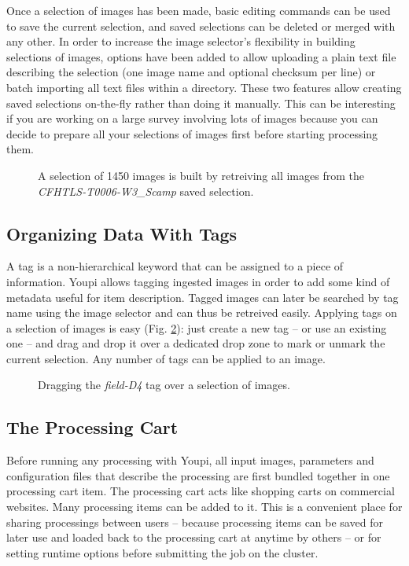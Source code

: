 \documentclass[11pt,twoside]{article}  %
\begin{document}
Once a selection of images has been made, basic editing commands can be used to save the 
current selection, and saved selections can be deleted or merged with any other. In order 
to increase the image selector's flexibility in building selections of images, options have 
been added to allow uploading a plain text file describing the selection (one image name 
and optional checksum per line) or batch importing all text files within a directory. 
These two features allow creating saved selections on-the-fly rather than doing it manually.
This can be interesting if you are working on a large survey involving lots of images because
you can decide to prepare all your selections of images first before starting processing them.

\begin{figure}[h]
\caption{A selection of 1450 images is built by retreiving all images from the 
\emph{CFHTLS-T0006-W3\_Scamp} saved selection.}\label{fig:ims}
\end{figure}

\subsection{Organizing Data With Tags}

A tag is a non-hierarchical keyword that can be assigned to a piece of information. Youpi 
allows tagging ingested images in order to add some kind of metadata useful for item 
description. Tagged images can later be searched by tag name using the image selector and 
can thus be retreived easily. Applying tags on a selection of images is easy (Fig. \ref{fig:tags}): 
just create a new tag -- or use an existing one -- and drag and drop it over a dedicated 
drop zone to mark or unmark the current selection. Any number of tags can be applied to an 
image.

\begin{figure}[h]
\caption{Dragging the \emph{field-D4} tag over a selection of images.}\label{fig:tags}
\end{figure}

\subsection{The Processing Cart}

Before running any processing with Youpi, all input images, parameters and configuration 
files that describe the processing are first bundled together in one processing cart item. 
The processing cart acts like shopping carts on commercial websites. Many processing items 
can be added to it. This is a convenient place for sharing processings between users -- because 
processing items can be saved for later use and loaded back to the processing cart at anytime 
by others -- or for setting runtime options before submitting the job on the cluster.
\end{document}
